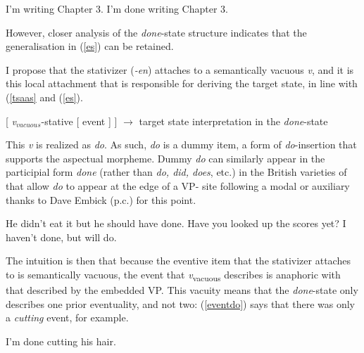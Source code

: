 \documentclass[output=paper,modfonts,nonflat]{langsci/langscibook}
\begin{document}
 \begin{exe}
\ex\label{progdrs}
\begin{xlist}
\ex  I'm writing Chapter 3.
\ex  I'm done writing Chapter 3.
\end{xlist}
\end{exe}



However, closer analysis of the \emph{done}-state structure indicates that the generalisation in (\ref{es}) can be retained.

I propose that the stativizer (\textit{-en}) attaches to a semantically vacuous \emph{v}, and it is this local attachment that is responsible for deriving the target state, in line with (\ref{tsaas} and (\ref{es}).

\begin{exe}
\ex\label{dsts}  {[ \emph{v}$_{vacuous}$-stative  [ event ] ]} $\rightarrow$ target state interpretation in the \emph{done}-state
\end{exe}

This \emph{v} is realized as \emph{do}. As such, \emph{do} is a dummy item, a
form of \emph{do}-insertion that supports the aspectual morpheme. Dummy
\emph{do} can similarly appear in the participial form \emph{done} (rather than
\emph{do, did, does}, etc.) in the British varieties of  that
allow \emph{do} to appear at the edge of a VP- site following a modal or auxiliary thanks to Dave Embick (p.c.) for this point.



\begin{exe}
\ex
\begin{xlist}
\ex He didn't eat it but he should have done.
\ex Have you looked up the scores yet? I haven't done, but will do.
\end{xlist}
\end{exe}



The intuition is then that because the eventive item that the stativizer
attaches to is semantically vacuous, the event that
\emph{v}\textsubscript{vacuous} describes is anaphoric with that described by
the embedded VP\@. This vacuity means that the \emph{done}-state only describes
one prior eventuality, and not two: (\ref{eventdo}) says that there was only a
\emph{cutting} event, for example.


\begin{exe}
\ex\label{eventdo} I'm done cutting his hair.
\end{exe}
\end{document}
